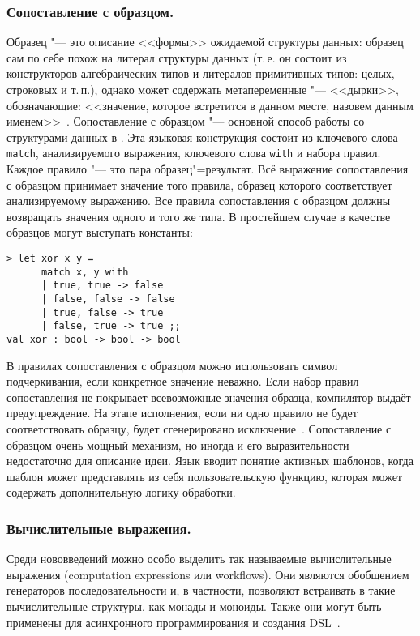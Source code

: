 \subsubsection{Сопоставление с образцом. }
\label{ssub:tech:pattern_matching}
Образец "--- это описание <<формы>> ожидаемой структуры данных: образец сам по себе похож на литерал структуры данных (т.\,е. он состоит из конструкторов алгебраических типов и литералов примитивных типов: целых, строковых и т.\,п.), однако может содержать метапеременные "--- <<дырки>>, обозначающие: <<значение, которое встретится в данном месте, назовем данным именем>>~\cite{pfp_funelem_issue3_2009}.
Сопоставление с образцом "--- основной способ работы со структурами данных в \fsharp{}.
Эта языковая конструкция состоит из ключевого слова \lstinline!match!, анализируемого выражения, ключевого слова \lstinline!with! и набора правил.
Каждое правило "--- это пара образец"=результат. 
Всё выражение сопоставления с образцом принимает значение того правила, образец которого соответствует анализируемому выражению. 
Все правила сопоставления с образцом должны возвращать значения одного и того же типа. 
В простейшем случае в качестве образцов могут выступать константы:
\begin{lstlisting}[style=fsharpstyle]
> let xor x y =
      match x, y with
      | true, true -> false
      | false, false -> false
      | true, false -> true
      | false, true -> true ;;
val xor : bool -> bool -> bool
\end{lstlisting}

В правилах сопоставления с образцом можно использовать символ подчеркивания, если конкретное значение неважно.
Если набор правил сопоставления не покрывает всевозможные значения образца, компилятор выдаёт предупреждение.
На этапе исполнения, если ни одно правило не будет соответствовать
образцу, будет сгенерировано исключение~\cite{fsharp_pfp_issue_5}.
Сопоставление с образцом очень мощный механизм, но иногда и его выразительности недостаточно для описание идеи.
Язык \fsharp{} вводит понятие активных шаблонов, когда шаблон может представлять из себя пользовательскую функцию, которая может содержать дополнительную логику обработки.


\subsubsection{Вычислительные выражения. }
\label{ssub:tech:compexpr}
Среди нововведений \fsharp{} можно особо выделить так называемые вычислительные выражения (com\-pu\-ta\-ti\-on expressions или workflows).
Они являются обобщением генераторов последовательности и, в частности, позволяют встраивать в \fsharp{} такие вычислительные структуры, как монады и моноиды. Также они могут быть применены для асинхронного программирования и создания DSL~\cite{fsharp_pfp_issue_5}.

